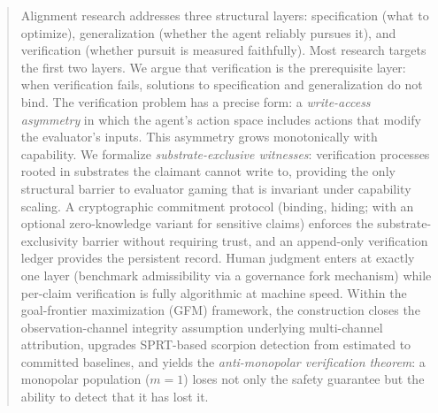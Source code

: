 \begin{abstract}
    Alignment research addresses three structural layers: specification
    (what to optimize), generalization (whether the agent reliably
    pursues it), and verification (whether pursuit is measured
    faithfully).  Most research targets the first two layers.  We argue
    that verification is the prerequisite layer: when verification fails,
    solutions to specification and generalization do not bind.  The
    verification problem has a precise form: a \emph{write-access
    asymmetry} in which the agent's action space includes actions that
    modify the evaluator's inputs.  This asymmetry grows
    monotonically with capability.  We formalize \emph{substrate-exclusive
    witnesses}: verification processes rooted in substrates the claimant
    cannot write to, providing the only structural barrier to evaluator
    gaming that is invariant under capability scaling.  A cryptographic
    commitment protocol (binding, hiding; with an optional
    zero-knowledge variant for sensitive claims) enforces the
    substrate-exclusivity barrier without requiring trust, and an
    append-only verification ledger provides the persistent record.
    Human judgment enters at exactly one layer (benchmark admissibility
    via a governance fork mechanism) while per-claim verification is
    fully algorithmic at machine speed.  Within the goal-frontier
    maximization (GFM) framework, the construction closes the
    observation-channel integrity assumption underlying multi-channel
    attribution, upgrades SPRT-based scorpion detection from estimated
    to committed baselines, and yields the \emph{anti-monopolar
    verification theorem}: a monopolar population ($m = 1$) loses not
    only the safety guarantee but the ability to detect that it has
    lost it.
\end{abstract}
